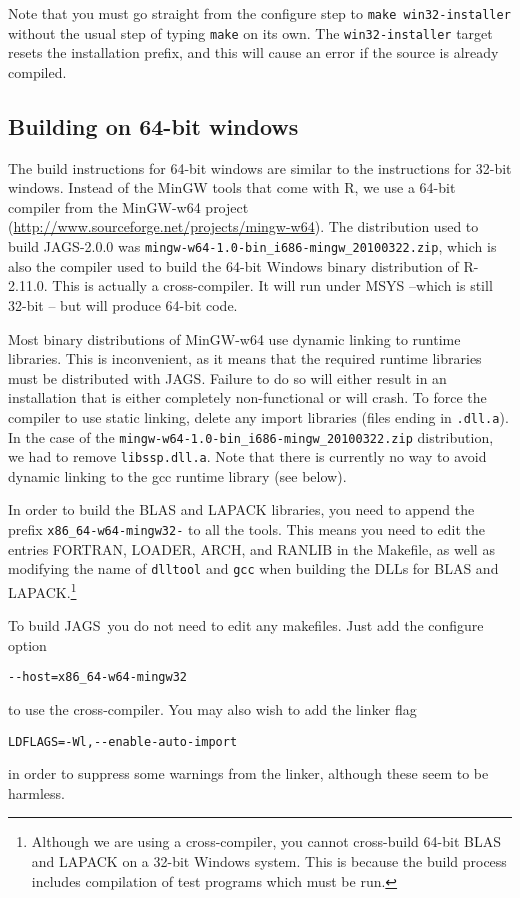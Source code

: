 \documentclass[11pt, a4paper, titlepage]{article}
\newcommand{\JAGS}{\textsf{JAGS}}
\begin{document}
Note that you must go straight from the configure step to \texttt{make
  win32-installer} without the usual step of typing \texttt{make} on
its own.  The \texttt{win32-installer} target resets the installation
prefix, and this will cause an error if the source is already
compiled.

\subsection{Building on 64-bit windows}

The build instructions for 64-bit windows are similar to the
instructions for 32-bit windows. Instead of the MinGW tools that come
with R, we use a 64-bit compiler from the MinGW-w64 project
(\url{http://www.sourceforge.net/projects/mingw-w64}).  The
distribution used to build JAGS-2.0.0 was
\verb+mingw-w64-1.0-bin_i686-mingw_20100322.zip+, which is also the
compiler used to build the 64-bit Windows binary distribution of
R-2.11.0. This is actually a cross-compiler. It will run under MSYS
--which is still 32-bit -- but will produce 64-bit code.

Most binary distributions of MinGW-w64 use dynamic linking to runtime
libraries. This is inconvenient, as it means that the required runtime
libraries must be distributed with JAGS. Failure to do so will either
result in an installation that is either completely non-functional or
will crash.  To force the compiler to use static linking, delete any
import libraries (files ending in \verb+.dll.a+). In the case of the
\verb+mingw-w64-1.0-bin_i686-mingw_20100322.zip+ distribution, we had
to remove \verb+libssp.dll.a+. Note that there is currently no way to
avoid dynamic linking to the gcc runtime library (see below).

In order to build the BLAS and LAPACK libraries, you need to append the
prefix \verb+x86_64-w64-mingw32-+ to all the tools. This means you need
to edit the entries FORTRAN, LOADER, ARCH, and RANLIB in the Makefile,
as well as modifying the name of \verb+dlltool+ and \verb+gcc+ when
building the DLLs for BLAS and LAPACK.\footnote{Although we are using
a cross-compiler, you cannot cross-build 64-bit BLAS and LAPACK on a
32-bit Windows system. This is because the build process includes compilation
of test programs which must be run.}

To build \JAGS\ you do not need to edit any makefiles. Just add the
configure option
\begin{verbatim}
--host=x86_64-w64-mingw32
\end{verbatim}
to use the cross-compiler.  You may also wish to add the linker flag
\begin{verbatim}
LDFLAGS=-Wl,--enable-auto-import
\end{verbatim}
in order to suppress some warnings from the linker, although these
seem to be harmless.
\end{document}
